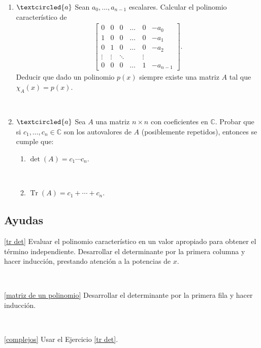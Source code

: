 \documentclass[12pt]{amsart}
\begin{document}
\begin{enumerate}[resume]
\

\item\label{matriz de un polinomio} $\textcircled{a}$ Sean $a_0, ..., a_{n-1}$ escalares. Calcular el polinomio caracter\'istico de
\begin{align*}
\begin{bmatrix} 0 & 0 & 0 &\dots & 0 & -a_0 \\ 1 & 0 & 0&  \dots & 0  & -a_1 \\ 0 & 1 & 0&  \dots & 0  & -a_2 \\ \vdots & \vdots & \ddots & \quad  & \vdots\\ 0 & 0 & 0 & \dots & 1  & -a_{n-1} 
\end{bmatrix}.		
 \end{align*}
Deducir que dado un polinomio $p(x)$ siempre existe una matriz $A$ tal que $\chi_A(x)=p(x)$.

\

\item\label{complejos} $\textcircled{a}$ Sea $A$ una matriz $n \times n$ con coeficientes en $\mathbb C$. Probar que si $c_1,\dots,c_n \in \mathbb C$ son los autovalores de $A$
(posiblemente repetidos), entonces se cumple que:



\begin{enumerate}
	\item $\det(A)=c_1\cdots c_n$.
	
	\
	
	\item $\operatorname{Tr}(A)=c_1+\cdots+c_n$.
\end{enumerate}

\end{enumerate}

\subsection*{Ayudas}

\eqref{tr det} Evaluar el polinomio caracter\'istico en un valor apropiado para obtener el t\'ermino independiente. Desarrollar el determinante por la primera columna y hacer inducci\'on, prestando atenci\'on a la potencias de $x$.

\

\eqref{matriz de un polinomio} Desarrollar el determinante por la primera fila y hacer inducci\'on.

\

\eqref{complejos} Usar el Ejercicio \eqref{tr det}.
\end{document}
